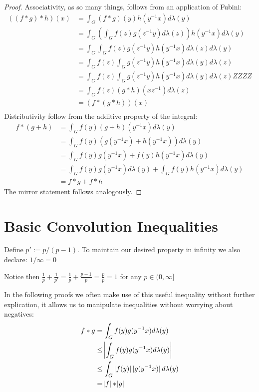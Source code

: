 \begin{proof}
Associativity, as so many things, follows from an application of Fubini:
\begin{align*}
((f \ast g) \ast  h )(x) &= \int_G (f \ast g)(y) h(y^{-1}x) d\lambda(y) \\
&= \int_G ( \int_G f(z)g(z^{-1}y)d\lambda(z)) h(y^{-1}x)d\lambda(y) \\
&= \int_G  \int_G f(z)g(z^{-1}y) h(y^{-1}x)d\lambda(z) d\lambda(y) \\
&= \int_G  f(z) \int_G g(z^{-1}y) h(y^{-1}x)d\lambda(y) d\lambda(z) \\
&= \int_G  f(z) \int_G g(z^{-1}y) h(y^{-1}x)d\lambda(y) d\lambda(z) ZZZZ\\
&= \int_G  f(z) (g \ast h)(xz^{-1}) d\lambda(z) \\
&= (f \ast (g \ast  h ))(x) \\
\end{align*}
Distributivity follow from the additive property of the integral:
\begin{align*}
f \ast (g + h) &= \int_G f(y) (g+h)(y^{-1}x)d\lambda(y)\\
&= \int_G f(y) (g(y^{-1}x)+h(y^{-1}x))d\lambda(y)\\
&= \int_G f(y)g(y^{-1}x)+f(y)h(y^{-1}x)d\lambda(y)\\
&= \int_G f(y)g(y^{-1}x) d\lambda(y) + \int_G f(y)h(y^{-1}x) d\lambda(y)\\
&= f \ast g + f \ast h
\end{align*}
The mirror statement follows analogously. 
\end{proof}

\section{Basic Convolution Inequalities}

\begin{definition}
Define $ p' := p / (p-1) $. To maintain our desired property in infinity we also declare: $1 / \infty = 0$
\end{definition}

\begin{remark}
Notice then $\frac{1}{p} + \frac{1}{p'} = \frac{1}{p} + \frac{p-1}{p} = \frac{p}{p} = 1$ for any $p \in (0,\infty]$
\end{remark}

\begin{remark}
In the following proofs we often make use of this useful inequality without further explication, it allows us to manipulate inequalities without worrying about negatives:
\begin{align*}
f \ast g &= \int_G f(y)g(y^{-1}x) d\lambda(y) \\
&\leq \abs{ \int_G f(y)g(y^{-1}x) d\lambda(y) } \\
&\leq \int_G \abs[0]{f(y)}\abs[0]{g(y^{-1}x)} d\lambda(y) \\
&= \abs{f} \ast \abs{g}
\end{align*}
\end{remark}

